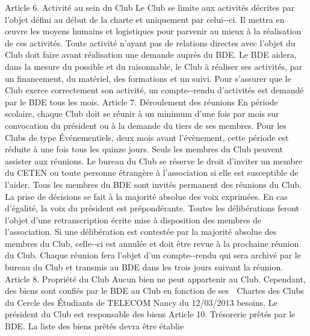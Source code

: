 \documentclass{article} %
\begin{document}
\begin{multicols}{2}
		Article  6. Activité  au  sein  du  Club   Le  Club  se  limite  aux  activités  décrites  par  l’objet  défini  au   début  de  la  charte  et  uniquement  par  celui-­‐ci.  Il  mettra  en   œuvre  les  moyens  humains  et  logistiques  pour  parvenir  au   mieux  à  la  réalisation  de  ces  activités.  Toute  activité  n’ayant   pas  de  relations  directes  avec  l’objet  du  Club  doit  faire  avant   réalisation  une  demande  auprès  du  BDE.  Le  BDE  aidera,  dans   la   mesure   du   possible   et   du   raisonnable,   le   Club   à   réaliser   ses   activités,   par   un   financement,   du   matériel,   des   formations  et  un  suivi.  
Pour  s’assurer  que  le  Club  exerce  correctement  son  activité,   un  compte-­‐rendu  d’activités  est  demandé  par  le  BDE  tous  les   mois.  
Article  7. Déroulement  des  réunions   En   période   scolaire,   chaque   Club   doit   se   réunir   à   un   minimum  d’une  fois  par  mois  sur  convocation  du  président   ou  à  la  demande  du  tiers  de  ses  membres.  Pour  les  Clubs  de   type   Événementiels,   deux   mois   avant   l’évènement,   cette   période  est  réduite  à  une  fois  tous  les  quinze  jours.  
Seuls  les  membres  du  Club  peuvent  assister  aux  réunions.  Le   bureau  du  Club  se  réserve  le  droit  d’inviter  un  membre  du   CETEN  ou  toute  personne  étrangère  à  l’association  si  elle  est   susceptible  de  l’aider.  Tous  les  membres  du  BDE  sont  invités   permanent  des  réunions  du  Club.  
La   prise   de   décisions   se   fait   à   la   majorité   absolue   des   voix   exprimées.   En   cas   d’égalité,   la   voix   du   président   est   prépondérante.  Toutes  les  délibérations  feront  l’objet  d’une   retranscription   écrite   mise   à   disposition   des   membres   de   l’association.   Si   une   délibération   est   contestée   par   la   majorité  absolue  des  membres  du  Club,  celle-­‐ci  est  annulée   et  doit  être  revue  à  la  prochaine  réunion  du  Club.  
Chaque   réunion   fera   l’objet   d’un   compte-­‐rendu   qui   sera   archivé  par  le  bureau  du  Club  et  transmis  au  BDE  dans  les   trois  jours  suivant  la  réunion.  
Article  8. Propriété  du  Club   Aucun   bien   ne   peut   appartenir   au   Club.   Cependant,   des   biens   sont   confiés   par   le   BDE   au   Club   en   fonction   de   ses  

Chartes  des  Clubs  du  Cercle  des  Étudiants  de  TELECOM  Nancy  du  12/03/2013  
besoins.   Le   président   du   Club   est   responsable   des   biens  
Article  10. Trésorerie   prêtés  par  le  BDE.  La  liste  des  biens  prêtés  devra  être  établie  

\end{multicols}
\end{document}
